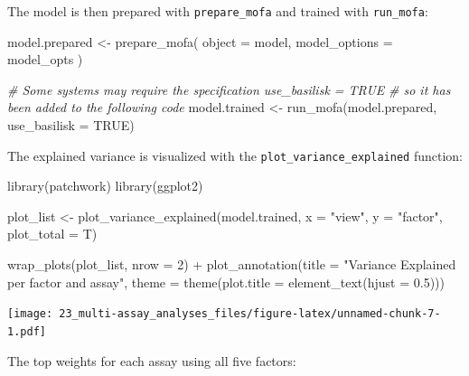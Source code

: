 \documentclass[
]{book}
\newenvironment{Shaded}{\begin{snugshade}}{\end{snugshade}}
\newcommand{\AttributeTok}[1]{\textcolor[rgb]{0.77,0.63,0.00}{#1}}
\newcommand{\CommentTok}[1]{\textcolor[rgb]{0.56,0.35,0.01}{\textit{#1}}}
\newcommand{\ConstantTok}[1]{\textcolor[rgb]{0.00,0.00,0.00}{#1}}
\newcommand{\DecValTok}[1]{\textcolor[rgb]{0.00,0.00,0.81}{#1}}
\newcommand{\FloatTok}[1]{\textcolor[rgb]{0.00,0.00,0.81}{#1}}
\newcommand{\FunctionTok}[1]{\textcolor[rgb]{0.00,0.00,0.00}{#1}}
\newcommand{\NormalTok}[1]{#1}
\newcommand{\OtherTok}[1]{\textcolor[rgb]{0.56,0.35,0.01}{#1}}
\newcommand{\SpecialCharTok}[1]{\textcolor[rgb]{0.00,0.00,0.00}{#1}}
\newcommand{\StringTok}[1]{\textcolor[rgb]{0.31,0.60,0.02}{#1}}
\begin{document}
The model is then prepared with \texttt{prepare\_mofa} and trained with \texttt{run\_mofa}:

\begin{Shaded}
\begin{Highlighting}[]
\NormalTok{model.prepared }\OtherTok{\textless{}{-}} \FunctionTok{prepare\_mofa}\NormalTok{(}
  \AttributeTok{object =}\NormalTok{ model,}
  \AttributeTok{model\_options =}\NormalTok{ model\_opts}
\NormalTok{)}

\CommentTok{\# Some systems may require the specification \textasciigrave{}use\_basilisk = TRUE\textasciigrave{}}
\CommentTok{\# so it has been added to the following code}
\NormalTok{model.trained }\OtherTok{\textless{}{-}} \FunctionTok{run\_mofa}\NormalTok{(model.prepared, }\AttributeTok{use\_basilisk =} \ConstantTok{TRUE}\NormalTok{)}
\end{Highlighting}
\end{Shaded}

The explained variance is visualized with the \texttt{plot\_variance\_explained} function:

\begin{Shaded}
\begin{Highlighting}[]
\FunctionTok{library}\NormalTok{(patchwork)}
\FunctionTok{library}\NormalTok{(ggplot2)}

\NormalTok{plot\_list }\OtherTok{\textless{}{-}} \FunctionTok{plot\_variance\_explained}\NormalTok{(model.trained,}
                                     \AttributeTok{x =} \StringTok{"view"}\NormalTok{, }\AttributeTok{y =} \StringTok{"factor"}\NormalTok{,}
                                     \AttributeTok{plot\_total =}\NormalTok{ T)}

\FunctionTok{wrap\_plots}\NormalTok{(plot\_list, }\AttributeTok{nrow =} \DecValTok{2}\NormalTok{) }\SpecialCharTok{+}
  \FunctionTok{plot\_annotation}\NormalTok{(}\AttributeTok{title =} \StringTok{"Variance Explained per factor and assay"}\NormalTok{,}
                  \AttributeTok{theme =} \FunctionTok{theme}\NormalTok{(}\AttributeTok{plot.title =} \FunctionTok{element\_text}\NormalTok{(}\AttributeTok{hjust =} \FloatTok{0.5}\NormalTok{)))}
\end{Highlighting}
\end{Shaded}

\texttt{[image: 23\_multi-assay\_analyses\_files/figure-latex/unnamed-chunk-7-1.pdf]}

The top weights for each assay using all five factors:
\end{document}
